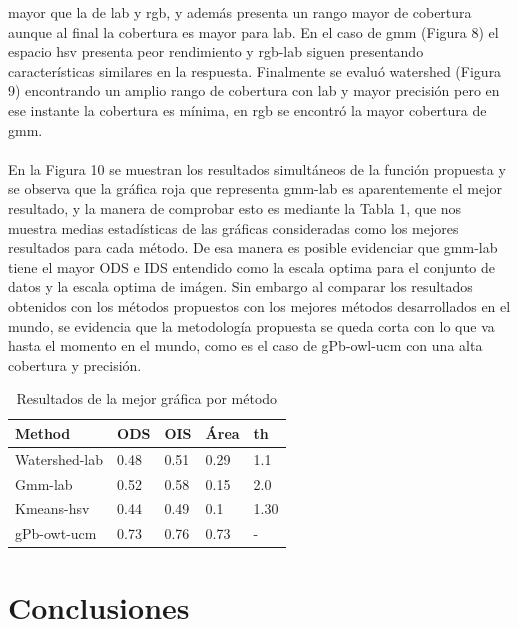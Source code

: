 \documentclass[10pt,twocolumn,letterpaper]{article}
\begin{document}
mayor que la de lab y rgb, y además presenta un rango mayor de cobertura aunque al final la cobertura es mayor para lab.
En el caso de gmm (Figura 8) el espacio hsv presenta peor rendimiento y rgb-lab siguen presentando características similares en la respuesta.
Finalmente se evaluó watershed (Figura 9) encontrando un amplio rango de cobertura con lab y mayor precisión pero en ese instante la cobertura es mínima, en rgb se encontró la mayor cobertura de gmm.
\\
\\
En la Figura 10 se muestran los resultados simultáneos de la función propuesta y se observa que la gráfica roja que representa gmm-lab es aparentemente el mejor resultado, y la manera de comprobar esto es mediante la Tabla 1,
que nos muestra medias estadísticas de las gráficas consideradas como los mejores resultados para cada método. De esa manera es posible evidenciar que gmm-lab tiene el mayor ODS e IDS entendido como la escala optima para el conjunto de datos y la escala optima de imágen.
Sin embargo al comparar los resultados obtenidos con los métodos propuestos con los mejores métodos desarrollados en el mundo\cite{5557884}, se evidencia que la metodología propuesta se queda corta con lo que va hasta el momento en el mundo, como es el caso de gPb-owl-ucm con una alta cobertura y precisión.  


\begin{table}
\begin{center}
\begin{tabular}{|l|l|l|l|l|}
\hline
Method & ODS & OIS & Área & th \\
\hline\hline
Watershed-lab & 0.48 & 0.51 & 0.29 & 1.1 \\
Gmm-lab & 0.52 & 0.58 & 0.15 & 2.0 \\
Kmeans-hsv & 0.44 & 0.49 & 0.1 & 1.30\\
gPb-owt-ucm & 0.73 & 0.76 & 0.73 &   - \\
\hline
\end{tabular}
\end{center}
\caption{Resultados de la mejor gráfica por método}
\end{table}

\section{Conclusiones}
\end{document}

